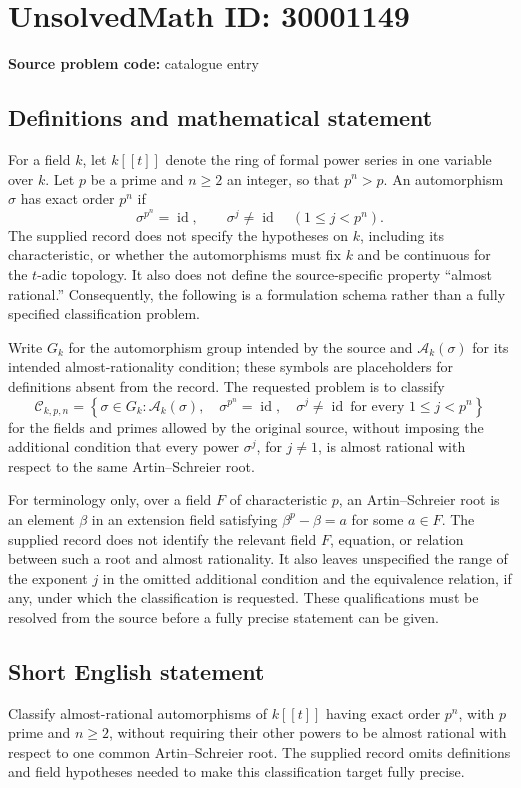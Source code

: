 \documentclass[11pt]{article}
\begin{document}
\section*{UnsolvedMath ID: 30001149}
\textbf{Source problem code:} catalogue entry
\subsection{Definitions and mathematical statement}
For a field \(k\), let \(k[[t]]\) denote the ring of formal power series in one variable over \(k\). Let \(p\) be a prime and \(n\geq 2\) an integer, so that \(p^n>p\). An automorphism \(\sigma\) has exact order \(p^n\) if
\[
\sigma^{p^n}=\operatorname{id},\qquad
\sigma^j\neq\operatorname{id}\quad(1\leq j<p^n).
\]
The supplied record does not specify the hypotheses on \(k\), including its characteristic, or whether the automorphisms must fix \(k\) and be continuous for the \(t\)-adic topology. It also does not define the source-specific property ``almost rational.'' Consequently, the following is a formulation schema rather than a fully specified classification problem.

Write \(G_k\) for the automorphism group intended by the source and \(\mathcal A_k(\sigma)\) for its intended almost-rationality condition; these symbols are placeholders for definitions absent from the record. The requested problem is to classify
\[
\mathcal C_{k,p,n}
=\left\{\sigma\in G_k:
\mathcal A_k(\sigma),\quad
\sigma^{p^n}=\operatorname{id},\quad
\sigma^j\neq\operatorname{id}\ \text{for every }1\leq j<p^n
\right\}
\]
for the fields and primes allowed by the original source, without imposing the additional condition that every power \(\sigma^j\), for \(j\neq 1\), is almost rational with respect to the same Artin--Schreier root.

For terminology only, over a field \(F\) of characteristic \(p\), an Artin--Schreier root is an element \(\beta\) in an extension field satisfying \(\beta^p-\beta=a\) for some \(a\in F\). The supplied record does not identify the relevant field \(F\), equation, or relation between such a root and almost rationality. It also leaves unspecified the range of the exponent \(j\) in the omitted additional condition and the equivalence relation, if any, under which the classification is requested. These qualifications must be resolved from the source before a fully precise statement can be given.
\subsection{Short English statement}
Classify almost-rational automorphisms of \(k[[t]]\) having exact order \(p^n\), with \(p\) prime and \(n\geq2\), without requiring their other powers to be almost rational with respect to one common Artin--Schreier root. The supplied record omits definitions and field hypotheses needed to make this classification target fully precise.
\end{document}
